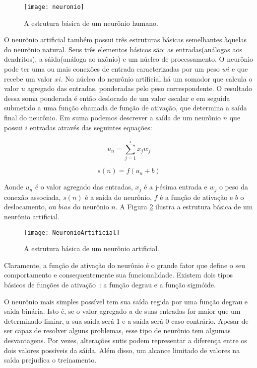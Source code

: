 \begin{figure}
\centering
\texttt{[image: neuronio]}
\caption[A estrutura básica de um neurônio humano.]{A estrutura básica de um neurônio humano.\protect\footnotemark}
\label{fig:neuronio}
\centering
\end{figure}

O neurônio artificial também possui três estruturas básicas semelhantes àquelas do neurônio natural. Seus três elementos básicos são: as entradas(análogas aos dendritos), a sáida(análoga ao axônio) e um núcleo de processamento. 
O neurônio pode ter uma ou mais conexões de entrada caracterizadas por um peso $wi$ e que recebe um valor $xi$. No núcleo do neurônio artificial há um somador que calcula o valor $u$ agregado das entradas, ponderadas pelo peso correspondente. O resultado dessa soma ponderada é então deslocado de um valor escalar e em seguida submetido a uma função chamada de função de ativação, que determina a saída final do neurônio. Em suma podemos descrever a saída de um neurônio $n$ que possui $i$ entradas através das seguintes equações:

\begin{equation}
 u_n = \sum_{j=1}^i x_jw_j
\end{equation}

\begin{equation}
s(n) = f(u_n + b)
\end{equation}

Aonde $u_n$ é o valor agregado das entradas, $x_j$ é a j-ésima entrada e $w_j$ o peso da conexão associada, $s(n)$ é a saída do neurônio, $f$ é a função de ativação e $b$ o deslocamento, ou $bias$ do neurônio $n$. A Figura \ref{fig:neuroartificial} ilustra a estrutura básica de um neurônio artificial.

\begin{figure}
\centering
\texttt{[image: NeuronioArtificial]}
\caption{A estrutura básica de um neurônio artificial.}
\label{fig:neuroartificial}
\centering
\end{figure}

Claramente, a função de ativação do neurônio é o grande fator que define o seu comportamento e consequentemente sua funcionalidade. Existem dois tipos básicos de funções de ativação~\cite{Haykin}: a função degrau e a função sigmóide.

O neurônio mais simples possível tem sua saída regida por uma função degrau e saída binária. Isto é, se o valor agregado $u$ de suas entradas for maior que um determinado limiar, a sua saída será 1 e a saída será 0 caso contrário. Apesar de ser capaz de resolver alguns problemas, esse tipo de neurônio tem algumas desvantagens. Por vezes, alterações sutis podem representar a diferença entre os dois valores possíveis da sáida. Além disso, um alcance limitado de valores na saída prejudica o treinamento.

